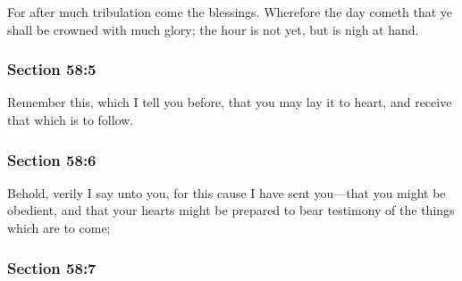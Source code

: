 		For after much tribulation come the blessings. Wherefore the day cometh that ye shall be crowned with much glory; the hour is not yet, but is nigh at hand.


	\subsubsection{Section 58:5} %
		\label{DC58-5}

		Remember this, which I tell you before, that you may lay it to heart, and receive that which is to follow.


	\subsubsection{Section 58:6} %
		\label{DC58-6}

		Behold, verily I say unto you, for this cause I have sent you---that you might be obedient, and that your hearts might be prepared to bear testimony of the things which are to come;


	\subsubsection{Section 58:7} %
		\label{DC58-7}

